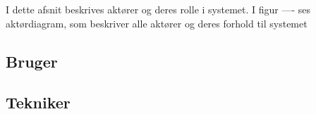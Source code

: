 
I dette afsnit beskrives aktører og deres rolle i systemet. I figur ---- ses aktørdiagram, som beskriver alle aktører og deres forhold til systemet




\newpage

\subsection{Bruger}
\begin{usecase}
\end{usecase}

\subsection{Tekniker}
\begin{usecase}
\end{usecase}




